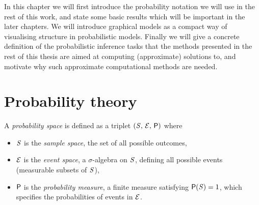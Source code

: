 In this chapter we will first introduce the probability notation we will use in the rest of this work, and state some basic results which will be important in the later chapters. We will introduce graphical models as a compact way of visualising structure in probabilistic models. Finally we will give a concrete definition of the probabilistic inference tasks that the methods presented in the rest of this thesis are aimed at computing (approximate) solutions to, and motivate why such approximate computational methods are needed.


\section{Probability theory}\label{sec:probability-theory}

A \emph{probability space} is defined as a triplet $(\mathit{S},\,\mathcal{E},\,\mathsf{P})$ where

\begin{itemize}
  \item $\mathit{S}$ is the \emph{sample space}, the set of all possible outcomes,
  \item $\mathcal{E}$ is the \emph{event space}, a $\sigma$-algebra on $\mathit{S}$, defining all possible events (measurable subsets of $\mathit{S}$),
  \item $\mathsf{P}$ is the \emph{probability measure}, a finite measure satisfying $\mathsf{P}(\mathit{S}) = 1$, which specifies the probabilities of events in $\mathcal{E}$.
\end{itemize}

